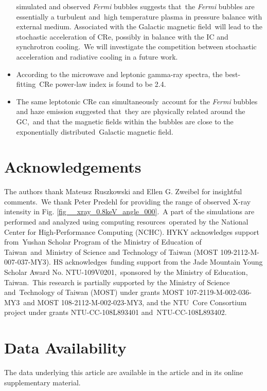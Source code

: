 \documentclass[fleqn,usenatbib,useAMS]{mnras}
\begin{document}
\begin{itemize}
      simulated and observed \textit{Fermi} bubbles suggests that\
      the \textit{Fermi} bubbles are essentially a turbulent and\
      high temperature plasma in pressure balance with external medium.
      Associated with the Galactic magnetic field\
      will lead to the stochastic acceleration of CRe, possibly in balance with the IC and synchrotron cooling.\
      We will investigate the competition between stochastic acceleration and radiative cooling in a future work.
\item According to the microwave and leptonic gamma-ray spectra, the best-fitting\
      CRe power-law index is found to be 2.4.
\item The same leptotonic CRe can simultaneously\
      account for the \textit{Fermi} bubbles and haze emission suggested that\
      they are physically related around the GC,\
      and that the magnetic fields within the bubbles are close to the exponentially distributed\
      Galactic magnetic field.
\end{itemize}



\section{Acknowledgements}
The authors thank Mateusz Ruszkowski and Ellen G. Zweibel for insightful comments.\
We thank Peter Predehl for providing the range of observed X-ray intensity in Fig. \ref{fig__xray_0.8keV_angle_000}.\
A part of the simulations are performed and analyzed using computing resources\
operated by the National Center for High-Performance Computing (NCHC).
HYKY acknowledges support from\
Yushan Scholar Program of the Ministry of Education of Taiwan\
and\
Ministry of Science and Technology of Taiwan (MOST 109-2112-M-007-037-MY3).
HS acknowledges\
funding support from the Jade Mountain Young Scholar Award No. NTU-109V0201,\
sponsored by the Ministry of Education, Taiwan.\
This research is partially supported by the Ministry of Science and\
Technology of Taiwan (MOST) under grants MOST 107-2119-M-002-036-MY3\
and MOST 108-2112-M-002-023-MY3, and the NTU\
Core Consortium project under grants NTU-CC-108L893401 and\
NTU-CC-108L893402.

\section*{Data Availability}
The data underlying this article are available in the article and in its online supplementary material.
\end{document}
